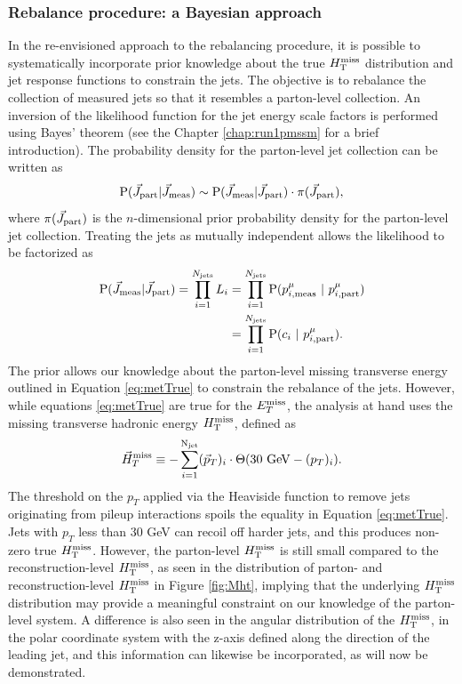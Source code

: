 \subsubsection{Rebalance procedure: a Bayesian approach}
In the re-envisioned approach to the rebalancing procedure,  it is possible to systematically  incorporate prior knowledge about the true $H_{\text{T}}^{\rm miss}$ distribution and jet response functions to constrain the jets. The objective is to rebalance the collection of measured jets so that it resembles a parton-level collection. An inversion of the likelihood function for the jet energy scale factors is performed using Bayes' theorem (see the Chapter \ref{chap:run1pmssm} for a brief introduction). The probability density for the parton-level jet collection can be written as
\begin{equation}
{\rm P}(\vec{J}_{\rm part}|\vec{J}_{\rm meas}) \sim {\rm P}(\vec{J}_{\rm meas}|\vec{J}_{\rm part})\cdot \pi(\vec{J}_{\rm part}),
\label{eq:posterior1}
\end{equation}
where $\pi(\vec{J}_{\rm part})$ is the $n$-dimensional prior probability density for the parton-level jet collection.
Treating the jets as mutually independent allows the likelihood to be factorized as
\begin{align}
\begin{split}
{\rm P}(\vec{J}_{\rm meas}|\vec{J}_{\rm part}) = \prod_{i=1}^{N_{\rm jets}}L_{i} &= \prod_{i=1}^{N_{\rm jets}}{\rm P}(p^{\mu}_{i,\rm meas}\ |\ p^{\mu}_{i,\rm part})\\
&=\prod_{i=1}^{N_{\rm jets}}{\rm P}(c_i\ |\ p^{\mu}_{i,\rm part}).
\end{split}
\label{eq:likelihood1}
\end{align}
The prior allows our knowledge about the parton-level missing transverse energy outlined in Equation \ref{eq:metTrue} to constrain the rebalance of the jets. However, while equations \ref{eq:metTrue} are true for the $E_{T}^{\rm miss}$, the analysis at hand uses the missing transverse hadronic energy $H_{\text{T}}^{\rm miss}$, defined as
\begin{equation}
\vec{H}_{T}^{\rm miss} \equiv -\sum_{i=1}^{{\rm N}_{\rm jet}}(\vec{p}_{T})_{i}\cdot\Theta(30{\rm\ GeV}-(p_{T})_{i}).
\end{equation}
The threshold on the $p_{T}$ applied via the Heaviside function to remove jets originating from pileup interactions spoils the equality in Equation \ref{eq:metTrue}. Jets with $p_{T}$ less than 30 GeV can recoil off harder jets, and this produces non-zero true $H_{\text{T}}^{\rm miss}$. However, the parton-level $H_{\text{T}}^{\rm miss}$ is still small compared to the reconstruction-level $H_{\text{T}}^{\rm miss}$, as seen in the distribution of parton- and reconstruction-level $H_{\text{T}}^{\rm miss}$ in Figure \ref{fig:Mht}, implying that the underlying $H_{\text{T}}^{\rm miss}$ distribution may provide a meaningful constraint on our knowledge of the parton-level system. A difference is also seen in the angular distribution of the $H_{\text{T}}^{\rm miss}$, in the polar coordinate system with the z-axis defined along the direction of the leading jet, and this information can likewise be incorporated, as will now be demonstrated.
